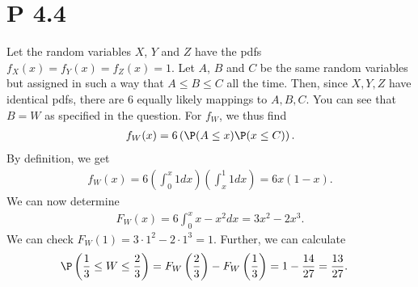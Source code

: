 \documentclass{article}
\begin{document}
\section*{P 4.4}


Let the random variables $X$, $Y$ and $Z$ have 
the pdfs $f_X(x)=f_Y(x)=f_Z(x)=1$. Let $A$, $B$ and $C$
be the same random variables but assigned in such a way that
$A\leq B\leq C$ all the time. Then, since $X,Y,Z$ have identical pdfs,
there are $6$ equally likely mappings to $A,B,C$.
You can see that $B=W$ as specified in the question. For $f_W$, 
we thus find
\begin{align*}
  f_W(x) = 6\left(\P(A \leq x)\P(x \leq C)\right).
\end{align*}
By definition, we get
\begin{align*}
  f_W(x) = 6\left(\int_0^x 1dx\right)\left(\int_x^1 1dx\right) = 6x(1-x).
\end{align*}
We can now determine
\begin{align*}
  F_W(x) = 6\int_0^x x - x^2 dx = 3x^2-2x^3.
\end{align*}
We can check $F_W(1) = 3\cdot 1^2 - 2 \cdot 1^3 = 1$. Further, we can
calculate
\begin{align*}
  \P\left(\frac{1}{3}\leq W \leq \frac{2}{3}\right)
  &= F_W\left(\frac{2}{3}\right) - F_W\left(\frac{1}{3}\right)
  = 1 - \frac{14}{27} = \frac{13}{27}.
\end{align*}
\end{document}

